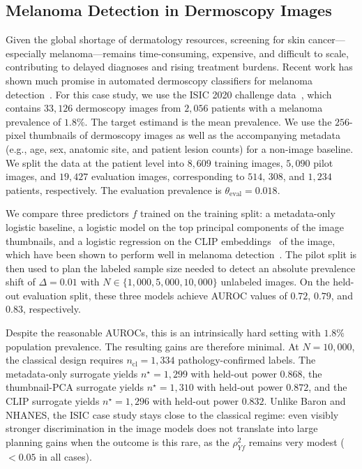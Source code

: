 \documentclass[12pt]{article}
\begin{document}
\subsection{Melanoma Detection in Dermoscopy Images}
Given the global shortage of dermatology resources, screening for skin
cancer---especially melanoma---remains time-consuming, expensive, and
difficult to scale, contributing to delayed diagnoses and rising
treatment burdens. Recent work has shown much promise in automated
dermoscopy classifiers for melanoma
detection~\citep{daneshjou2022disparities,xu2024foundation,chen2024singlelesion}. For this case study, we use the ISIC 2020 challenge
data~\citep{rotemberg2021patient}, which contains $33{,}126$
dermoscopy images from $2{,}056$ patients with a melanoma prevalence
of $1.8\%$.  The target estimand is the mean prevalence.  We use the
$256$-pixel thumbnails of dermoscopy images as well as the
accompanying metadata (e.g., age, sex, anatomic site, and patient
lesion counts) for a non-image baseline.  We split the data at the
patient level into $8{,}609$ training images, $5{,}090$ pilot images,
and $19{,}427$ evaluation images, corresponding to $514$, $308$, and
$1{,}234$ patients, respectively.  The evaluation prevalence is
$\theta_{\mathrm{eval}} = 0.018$.

We compare three predictors $f$ trained on the training split: a
metadata-only logistic baseline, a logistic model on the top principal
components of the image thumbnails, and a logistic regression on the CLIP
embeddings~\citep{radford2021clip} of the image, which have been shown
to perform well in melanoma detection~\citep{xu2024foundation}. The pilot split is then used to
plan the labeled sample size needed to detect an absolute prevalence
shift of $\Delta = 0.01$ with
$N \in \{1{,}000, 5{,}000, 10{,}000\}$ unlabeled images.  On the
held-out evaluation split, these three models achieve AUROC values of
$0.72$, $0.79$, and $0.83$, respectively.

Despite the reasonable AUROCs, this is an intrinsically hard setting
with $1.8\%$ population prevalence.  The resulting gains are therefore minimal.  At $N = 10{,}000$, the classical design
requires $n_{\mathrm{cl}} = 1{,}334$ pathology-confirmed labels.  The
metadata-only surrogate yields $n^\star = 1{,}299$ with held-out
power $0.868$, the thumbnail-PCA surrogate yields
$n^\star = 1{,}310$ with held-out power $0.872$, and the CLIP
surrogate yields $n^\star = 1{,}296$ with held-out power $0.832$.
Unlike Baron and NHANES, the ISIC case study stays close to the
classical regime: even visibly stronger discrimination in the image
models does not translate into large planning gains when the outcome
is this rare, as the $\rho_{Yf}^2$ remains very modest ($<0.05$ in
all cases).
\end{document}
